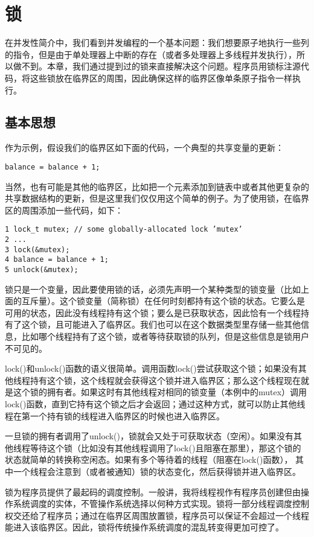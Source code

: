 \chapter{锁}
\thispagestyle{empty}

在并发性简介中，我们看到并发编程的一个基本问题：我们想要原子地执行一些列的指令，但是由于单处理器上中断的存在（或者多处理器上多线程并发执行），所以做不到。本章，我们通过提到过的锁来直接解决这个问题。程序员用锁标注源代码，将这些锁放在临界区的周围，因此确保这样的临界区像单条原子指令一样执行。

\section{基本思想}
作为示例，假设我们的临界区如下面的代码，一个典型的共享变量的更新：
\begin{verbatim}
balance = balance + 1;
\end{verbatim}
当然，也有可能是其他的临界区，比如把一个元素添加到链表中或者其他更复杂的共享数据结构的更新，但是这里我们仅仅用这个简单的例子。为了使用锁，在临界区的周围添加一些代码，如下：
\begin{verbatim}
1 lock_t mutex; // some globally-allocated lock ’mutex’
2 ...
3 lock(&mutex);
4 balance = balance + 1;
5 unlock(&mutex);
\end{verbatim}

锁只是一个变量，因此要使用锁的话，必须先声明一个某种类型的锁变量（比如上面的互斥量）。这个锁变量（简称锁）在任何时刻都持有这个锁的状态。它要么是可用的状态，因此没有线程持有这个锁；要么是已获取状态，因此恰有一个线程持有了这个锁，且可能进入了临界区。我们也可以在这个数据类型里存储一些其他信息，比如哪个线程持有了这个锁，或者等待获取锁的队列，但是这些信息是锁用户不可见的。

lock()和unlock()函数的语义很简单。调用函数lock()尝试获取这个锁；如果没有其他线程持有这个锁，这个线程就会获得这个锁并进入临界区；那么这个线程现在就是这个锁的拥有者。如果这时有其他线程对相同的锁变量（本例中的mutex）调用lock()函数，直到它持有这个锁之后才会返回；通过这种方式，就可以防止其他线程在第一个持有锁的线程进入临界区的时候也进入临界区。

一旦锁的拥有者调用了unlock()，锁就会又处于可获取状态（空闲）。如果没有其他线程等待这个锁（比如没有其他线程调用了lock()且阻塞在那里），那这个锁的状态就简单的转换称空闲态。如果有多个等待着的线程（阻塞在lock()函数）， 其中一个线程会注意到（或者被通知）锁的状态变化，然后获得锁并进入临界区。

锁为程序员提供了最起码的调度控制。一般讲，我将线程视作有程序员创建但由操作系统调度的实体，不管操作系统选择以何种方式实现。锁将一部分线程调度控制权交还给了程序员；通过在临界区周围放置锁，程序员可以保证不会超过一个线程能进入该临界区。因此，锁将传统操作系统调度的混乱转变得更加可控了。


